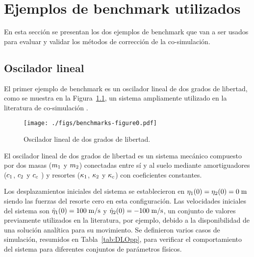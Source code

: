 


\chapter{Ejemplos de benchmark utilizados}
\label{ch:ejemplos}


En esta sección se presentan los dos ejemplos de benchmark que van a ser usados para evaluar y validar los métodos de corrección de la co-simulación.

\section{Oscilador lineal}
\label{sec:oscilador}

El primer ejemplo de benchmark es un oscilador lineal de dos grados de libertad, como se muestra en la Figura~\ref{fig:OsciladorLinealMono}, un sistema ampliamente utilizado en la literatura de co-simulación \cite{Gonzalez2011,Schweizer2015,Gomes2018,Gonzalez2019}.

\begin{figure}[ht!]\centering
	\texttt{[image: ./figs/benchmarks-figure0.pdf]}
	\caption{Oscilador lineal de dos grados de libertad.}
	\label{fig:OsciladorLinealMono}
\end{figure}

El oscilador lineal de dos grados de libertad es un sistema mecánico compuesto por dos masas ($m_1$ y $m_2$) conectadas entre sí y al suelo mediante amortiguadores ($c_1$, $c_2$ y $c_c$ ) y resortes ($\kappa_1$, $\kappa_2$ y $\kappa_c$) con coeficientes constantes.

Los desplazamientos iniciales del sistema se establecieron en $\eta_1(0) = \eta_2(0) = 0{\; \mathrm {m}}$ siendo las fuerzas del resorte cero en esta configuración.
Las velocidades iniciales del sistema son $\dot{\eta}_1(0) = 100{\; \mathrm {m/s}}$ y $\dot{\eta}_2(0) = -100{\; \mathrm {m/s}}$, un conjunto de valores previamente utilizados en la literatura, por ejemplo, \cite{Schweizer2014,Schweizer2015a,Gonzalez2019} debido a la disponibilidad de una solución analítica para su movimiento.
Se definieron varios casos de simulación, resumidos en Tabla~\ref{tab:DLOpp}, para verificar el comportamiento del sistema para diferentes conjuntos de parámetros físicos.

